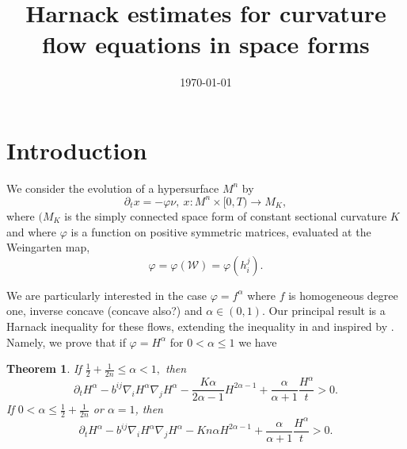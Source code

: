 \documentclass{amsart}
\newtheorem{theorem}{Theorem}
\theoremstyle{definition}
\theoremstyle{remark}
\numberwithin{equation}{section}
\begin{document}
\title[]
 {Harnack estimates for curvature flow equations in space forms}

\curraddr{}
\email{}
\date{\today}

\dedicatory{}
\subjclass[2010]{}
\keywords{}

\begin{abstract}
\end{abstract}

\maketitle

\section{Introduction}

We consider the evolution of a hypersurface $M^n$ by
\[
\partial_tx=-\varphi\nu,~ x:M^n\times[0,T)\to M_K,
\]
where \((M_K\) is the simply connected space form of constant sectional curvature \(K\) and where $\varphi$ is a function on positive symmetric matrices, evaluated at the Weingarten map,
\[
\varphi = \varphi(\mathcal{W}) = \varphi(h^j_i).
\]

We are particularly interested in the case \(\varphi = f^{\alpha}\) where \(f\) is homogeneous degree one, inverse concave (concave also?) and \(\alpha \in (0,1)\). Our principal result is a Harnack inequality for these flows, extending the inequality in \cite{2015arXiv150802821B, bryanlouie} and inspired by \cite{MR1316556, MR1100812, MR1296393, MR1480081}. Namely, we prove that if \(\varphi = H^{\alpha}\) for \(0 < \alpha \leq 1\) we have

\begin{theorem}
If $\frac{1}{2}+\frac{1}{2n}\leq {\alpha}< 1,$ then
\[
\partial_tH^{\alpha} - b^{ij}\nabla_iH^{\alpha}\nabla_jH^{\alpha} - \frac{K {\alpha}}{2{\alpha}-1}H^{2{\alpha}-1} + \frac{{\alpha}}{{\alpha}+1} \frac{H^{\alpha}}{t} > 0.
\]
If $0<{\alpha}\leq \frac{1}{2} + \frac{1}{2n}$ or ${\alpha}=1$, then
\[
\partial_tH^{\alpha} - b^{ij}\nabla_iH^{\alpha}\nabla_jH^{\alpha} - K n{\alpha}H^{2{\alpha}-1} + \frac{{\alpha}}{{\alpha}+1} \frac{H^{\alpha}}{t} > 0.
\]
\end{theorem}
\end{document}
